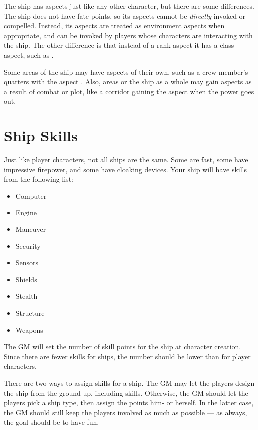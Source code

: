 \documentclass[12pt,titlepage,openany]{book}
\begin{document}
The ship has aspects just like any other character, but there are some
differences. The ship does not have fate points, so its aspects cannot be
\emph{directly} invoked or compelled. Instead, its aspects are treated as
environment aspects when appropriate, and can be invoked by players whose
characters are interacting with the ship. The other difference is that instead
of a rank aspect it has a class aspect, such as .

Some areas of the ship may have aspects of their own, such as a crew member's
quarters with the aspect . Also, areas or the ship
as a whole may gain aspects as a result of combat or plot, like a corridor
gaining the aspect  when the power goes out.

\section{Ship Skills}\label{sec:ship-skills}

Just like player characters, not all ships are the same. Some are fast, some
have impressive firepower, and some have cloaking devices. Your ship will have
skills from the following list:

\begin{multicols}{3}
    \raggedcolumns
    \begin{itemize}
        \item Computer
        \item Engine
        \item Maneuver
        \item Security
        \item Sensors
        \item Shields
        \item Stealth
        \item Structure
        \item Weapons
    \end{itemize}
\end{multicols}

The GM will set the number of skill points for the ship at character creation.
Since there are fewer skills for ships, the number should be lower than for
player characters.

There are two ways to assign skills for a ship. The GM may let the players design
the ship from the ground up, including skills. Otherwise, the GM should let the
players pick a ship type, then assign the points him- or herself. In the latter
case, the GM should still keep the players involved as much as possible --- as
always, the goal should be to have fun.
\end{document}
